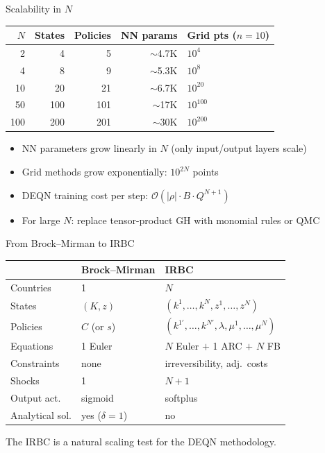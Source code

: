 \documentclass[aspectratio=169,11pt]{beamer}
\newcommand{\emphc}[1]{\textcolor{harvardcrimson}{#1}}
\begin{document}
\begin{frame}{Scalability in $N$}
\begin{center}
\begin{tabular}{rrrrl}
\toprule
$N$ & \textbf{States} & \textbf{Policies} & \textbf{NN params} & \textbf{Grid pts ($n\!=\!10$)} \\
\midrule
2 & 4 & 5 & $\sim$4.7K & $10^4$ \\
4 & 8 & 9 & $\sim$5.3K & $10^8$ \\
10 & 20 & 21 & $\sim$6.7K & $10^{20}$ \\
50 & 100 & 101 & $\sim$17K & $10^{100}$ \\
100 & 200 & 201 & $\sim$30K & $10^{200}$ \\
\bottomrule
\end{tabular}
\end{center}

\vspace{0.5em}
\begin{itemize}
    \item NN parameters grow \emphc{linearly} in $N$ (only input/output layers scale)
    \item Grid methods grow \emphc{exponentially}: $10^{2N}$ points
    \item DEQN training cost per step: $\mathcal{O}(|\rho| \cdot B \cdot Q^{N+1})$
    \item For large $N$: replace tensor-product GH with monomial rules or QMC
\end{itemize}
\end{frame}

\begin{frame}{From Brock--Mirman to IRBC}
\begin{center}
\begin{tabular}{lll}
\toprule
& \textbf{Brock--Mirman} & \textbf{IRBC} \\
\midrule
Countries & 1 & $N$ \\
States & $(K, z)$ & $(k^1, \ldots, k^N, z^1, \ldots, z^N)$ \\
Policies & $C$ (or $s$) & $(k^{1\prime}, \ldots, k^{N\prime}, \lambda, \mu^1, \ldots, \mu^N)$ \\
Equations & 1 Euler & $N$ Euler $+$ 1 ARC $+$ $N$ FB \\
Constraints & none & irreversibility, adj.\ costs \\
Shocks & 1 & $N+1$ \\
Output act. & sigmoid & softplus \\
Analytical sol. & yes ($\delta=1$) & no \\
\bottomrule
\end{tabular}
\end{center}

\vspace{0.3em}
{\small The IRBC is a natural \emphc{scaling test} for the DEQN methodology.}
\end{frame}
\end{document}
